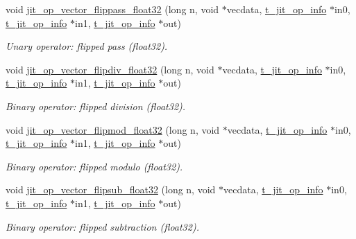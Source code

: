 \begin{DoxyCompactItemize}
void \hyperlink{group__opvecmod_ga80ad91dae3359d0e7160afb855811b50}{jit\_\-op\_\-vector\_\-flippass\_\-float32} (long n, void $\ast$vecdata, \hyperlink{structt__jit__op__info}{t\_\-jit\_\-op\_\-info} $\ast$in0, \hyperlink{structt__jit__op__info}{t\_\-jit\_\-op\_\-info} $\ast$in1, \hyperlink{structt__jit__op__info}{t\_\-jit\_\-op\_\-info} $\ast$out)
\begin{DoxyCompactList}\small\item\em Unary operator: flipped pass (float32). \item\end{DoxyCompactList}\item 
void \hyperlink{group__opvecmod_ga00e97f99263939c023aaf3e8b661131d}{jit\_\-op\_\-vector\_\-flipdiv\_\-float32} (long n, void $\ast$vecdata, \hyperlink{structt__jit__op__info}{t\_\-jit\_\-op\_\-info} $\ast$in0, \hyperlink{structt__jit__op__info}{t\_\-jit\_\-op\_\-info} $\ast$in1, \hyperlink{structt__jit__op__info}{t\_\-jit\_\-op\_\-info} $\ast$out)
\begin{DoxyCompactList}\small\item\em Binary operator: flipped division (float32). \item\end{DoxyCompactList}\item 
void \hyperlink{group__opvecmod_gadbf380ca71e3bb2f38793b38e7b10786}{jit\_\-op\_\-vector\_\-flipmod\_\-float32} (long n, void $\ast$vecdata, \hyperlink{structt__jit__op__info}{t\_\-jit\_\-op\_\-info} $\ast$in0, \hyperlink{structt__jit__op__info}{t\_\-jit\_\-op\_\-info} $\ast$in1, \hyperlink{structt__jit__op__info}{t\_\-jit\_\-op\_\-info} $\ast$out)
\begin{DoxyCompactList}\small\item\em Binary operator: flipped modulo (float32). \item\end{DoxyCompactList}\item 
void \hyperlink{group__opvecmod_gad3182b8739f7c992998de4c6ed76fc54}{jit\_\-op\_\-vector\_\-flipsub\_\-float32} (long n, void $\ast$vecdata, \hyperlink{structt__jit__op__info}{t\_\-jit\_\-op\_\-info} $\ast$in0, \hyperlink{structt__jit__op__info}{t\_\-jit\_\-op\_\-info} $\ast$in1, \hyperlink{structt__jit__op__info}{t\_\-jit\_\-op\_\-info} $\ast$out)
\begin{DoxyCompactList}\small\item\em Binary operator: flipped subtraction (float32). \item\end{DoxyCompactList}\item 

\end{DoxyCompactItemize}

